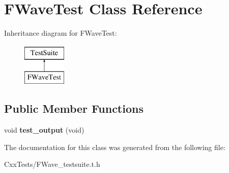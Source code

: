 \hypertarget{classFWaveTest}{\section{F\-Wave\-Test Class Reference}
\label{classFWaveTest}
}
Inheritance diagram for F\-Wave\-Test\-:\begin{figure}[H]
\begin{center}
\leavevmode
\includegraphics[height=2.000000cm]{classFWaveTest}
\end{center}
\end{figure}
\subsection*{Public Member Functions}
\begin{DoxyCompactItemize}
\item 
\hypertarget{classFWaveTest_a6fbc3fad7ac5231e82761d83fb8dbd03}{void {\bfseries test\-\_\-output} (void)}\label{classFWaveTest_a6fbc3fad7ac5231e82761d83fb8dbd03}

\end{DoxyCompactItemize}


The documentation for this class was generated from the following file\-:\begin{DoxyCompactItemize}
\item 
Cxx\-Tests/F\-Wave\-\_\-testsuite.\-t.\-h\end{DoxyCompactItemize}
